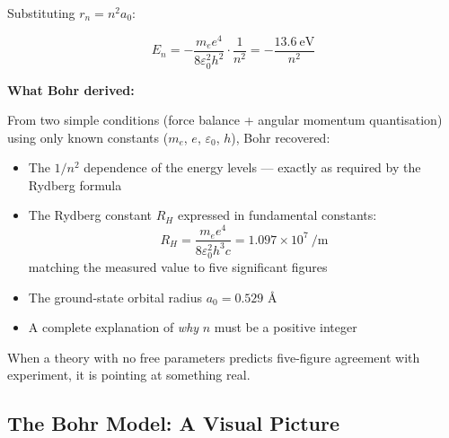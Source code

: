 \documentclass[12pt, a4paper]{book}
\begin{document}
Substituting $r_n = n^2 a_0$:

\[
  \boxed{E_n = -\frac{m_e e^4}{8\varepsilon_0^2 h^2} \cdot \frac{1}{n^2}
             = -\frac{13.6\ \text{eV}}{n^2}}
\]

\begin{discoverybox}
\textbf{What Bohr derived:}

From two simple conditions (force balance + angular momentum quantisation)
using only known constants ($m_e$, $e$, $\varepsilon_0$, $h$),
Bohr recovered:

\begin{itemize}[nosep, leftmargin=2em]
  \item The $1/n^2$ dependence of the energy levels --- exactly as required
        by the Rydberg formula
  \item The Rydberg constant $R_H$ expressed in fundamental constants:
        \[
          R_H = \frac{m_e e^4}{8\varepsilon_0^2 h^3 c}
              = 1.097\times10^7\ \si{\per\metre}
        \]
        matching the measured value to five significant figures
  \item The ground-state orbital radius $a_0 = 0.529$ \AA
  \item A complete explanation of \emph{why} $n$ must be a positive integer
\end{itemize}

When a theory with no free parameters predicts five-figure
agreement with experiment, it is pointing at something real.
\end{discoverybox}

\subsection{The Bohr Model: A Visual Picture}
\end{document}
